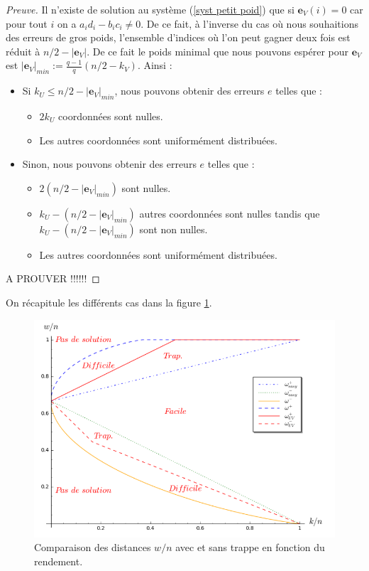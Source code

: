 \documentclass[12pt]{article}
\theoremstyle{definition}
\newcommand{\e}{\mathbf{e}}
\begin{document}
\begin{proof}[Preuve]
Il n'existe de solution au système (\ref{syst petit poid}) que si $\e_V(i)=0$ car pour tout $i$ on a $a_id_i -b_ic_i \neq 0$. De ce fait, à l'inverse du cas où nous souhaitions des erreurs de gros poids, l'ensemble d'indices où l'on peut gagner deux fois est réduit à $n/2 - |\e_V|$. De ce fait le poids minimal que nous pouvons espérer pour $\e_V$ est $|\e_V|_{min} := \frac{q-1}{q}(n/2-k_V)$. Ainsi :
\begin{itemize}
\item Si $k_U \leq n/2 - |\e_V|_{min}$, nous pouvons obtenir des erreurs $e$ telles que :
	\begin{itemize}
	\item $2k_U$ coordonnées sont nulles.
	\item Les autres coordonnées sont uniformément distribuées.
	\end{itemize}
\item Sinon, nous pouvons obtenir des erreurs $e$ telles que :
	\begin{itemize}
	\item $2(n/2 - |\e_V|_{min})$ sont nulles.
	\item $k_U - (n/2 - |\e_V|_{min})$ autres coordonnées sont nulles tandis que $k_U - (n/2 - |\e_V|_{min})$ sont non nulles.
	\item Les autres coordonnées sont uniformément distribuées.
	\end{itemize}
\end{itemize} 
A PROUVER !!!!!!
\end{proof}

On récapitule les différents cas dans la figure \ref{graphique ratio}. \\

\begin{figure}[h]
\label{graphique ratio}
\begin{center}
\includegraphics [scale=0.4]{graph_ratio_w.png}
\end{center}
\caption{\small Comparaison des distances $w/n$ avec et sans trappe en fonction du rendement.}
\end{figure}
\end{document}
